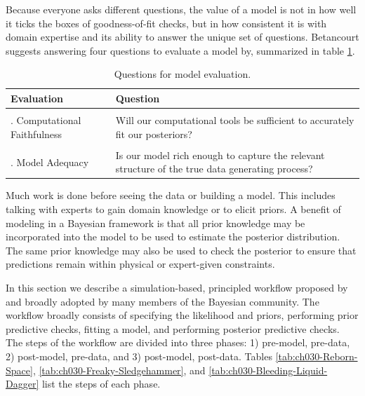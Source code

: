\documentclass[11pt, oneside, openany]{scrbook}
\begin{document}
Because everyone asks different questions, the value of a model is not in how well it ticks the boxes of goodness-of-fit checks, but in how consistent it is with domain expertise and its ability to answer the unique set of questions. Betancourt suggests answering four questions to evaluate a model by, summarized in table \ref{tab:ch030-Confidential-Proton}.

\begin{table}[!h]

\caption{\label{tab:ch030-Confidential-Proton}Questions for model evaluation.}
\centering
\begin{tabular}[t]{>{\raggedright\arraybackslash}p{1.75in}>{\raggedright\arraybackslash}p{3.25in}}
\toprule
Evaluation & Question\\
\midrule
\cellcolor{gray!6}{1. Domain Expertise Consistency} & \cellcolor{gray!6}{Is our model consistent with our domain expertise?}\\
2. Computational Faithfulness & Will our computational tools be sufficient to accurately fit our posteriors?\\
\cellcolor{gray!6}{3. Inferential Adequacy} & \cellcolor{gray!6}{Will our inferences provide enough information to answer our questions?}\\
4. Model Adequacy & Is our model rich enough to capture the relevant structure of the true data generating process?\\
\bottomrule
\end{tabular}
\end{table}

Much work is done before seeing the data or building a model. This includes talking with experts to gain domain knowledge or to elicit priors. A benefit of modeling in a Bayesian framework is that all prior knowledge may be incorporated into the model to be used to estimate the posterior distribution. The same prior knowledge may also be used to check the posterior to ensure that predictions remain within physical or expert-given constraints.

In this section we describe a simulation-based, principled workflow proposed by \citet{betancourt2020} and broadly adopted by many members of the Bayesian community. The workflow broadly consists of specifying the likelihood and priors, performing prior predictive checks, fitting a model, and performing posterior predictive checks. The steps of the workflow are divided into three phases: 1) pre-model, pre-data, 2) post-model, pre-data, and 3) post-model, post-data. Tables \ref{tab:ch030-Reborn-Space}, \ref{tab:ch030-Freaky-Sledgehammer}, and \ref{tab:ch030-Bleeding-Liquid-Dagger} list the steps of each phase.
\end{document}
